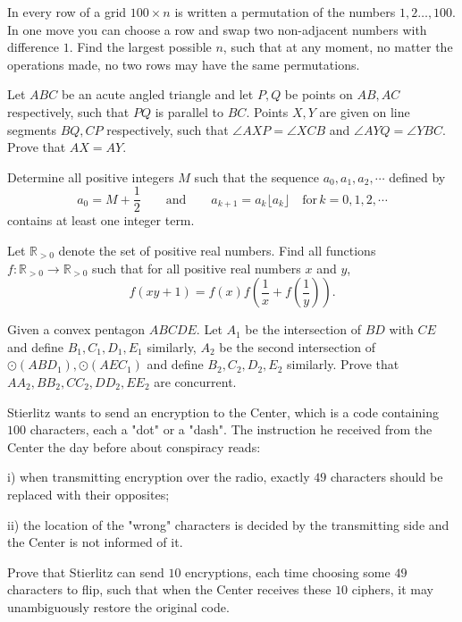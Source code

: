 \documentclass[11pt]{scrartcl}
\begin{document}
\begin{problem}[5664985199661230516]
In every row of a grid $100 \times n$ is written a permutation of the numbers $1,2 \ldots, 100$. In one move you can choose a row and swap two non-adjacent numbers with difference $1$. Find the largest possible $n$, such that at any moment, no matter the operations made, no two rows may have the same permutations.
\end{problem}
\begin{problem}[143601603071770]
	Let $ABC$ be an acute angled triangle and let $P, Q$ be points on $AB, AC$ respectively, such that $PQ$ is parallel to $BC$. Points $X, Y$ are given on line segments $BQ, CP$ respectively, such that $\angle AXP = \angle XCB$ and $\angle AYQ = \angle YBC$. Prove that $AX = AY$.

\end{problem}
\begin{problem}[905557261061260]
Determine all positive integers $M$ such that the sequence $a_0, a_1, a_2, \cdots$ defined by\[ a_0 = M + \frac{1}{2}   \qquad  \textrm{and} \qquad    a_{k+1} = a_k\lfloor a_k \rfloor   \quad \textrm{for} \, k = 0, 1, 2, \cdots \]contains at least one integer term.
\end{problem}
\begin{problem}[3569981165307602347]
Let \(\mathbb R_{>0}\) denote the set of positive real numbers. Find all functions \(f:\mathbb R_{>0}\to\mathbb R_{>0}\) such that for all positive real numbers \(x\) and \(y\),\[f(xy+1)=f(x)f\left(\frac1x+f\left(\frac1y\right)\right).\]
\end{problem}
\begin{problem}[651308339506337942]
Given a convex pentagon $ ABCDE. $ Let $ A_1 $ be the intersection of $ BD $ with $ CE $ and define $ B_1, C_1, D_1, E_1 $ similarly, $ A_2 $ be the second intersection of $ \odot (ABD_1),\odot (AEC_1) $ and define $ B_2, C_2, D_2, E_2 $ similarly. Prove that $ AA_2, BB_2, CC_2, DD_2, EE_2 $ are concurrent.
\end{problem}
\begin{problem}[966139221944695]
Stierlitz wants to send an encryption to the Center, which is a code containing $100$ characters, each a "dot" or a "dash". The instruction he received from the Center the day before about conspiracy reads:

i) when transmitting encryption over the radio, exactly $49$ characters should be replaced with their opposites;

ii) the location of the "wrong" characters is decided by the transmitting side and the Center is not informed of it.

Prove that Stierlitz can send $10$ encryptions, each time choosing some $49$ characters to flip, such that when the Center receives these $10$ ciphers, it may unambiguously restore the original code.
\end{problem}
\end{document}
